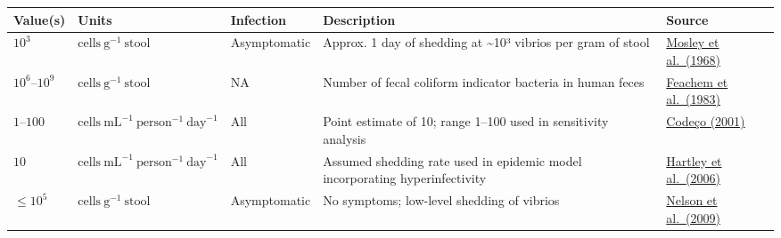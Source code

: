 \documentclass[
]{book}
\begin{document}
\begin{longtable}[]{@{}
  >{\raggedright\arraybackslash}p{}
  >{\raggedright\arraybackslash}p{}
  >{\raggedright\arraybackslash}p{}
  >{\raggedright\arraybackslash}p{}
  >{\raggedright\arraybackslash}p{}@{}}
\toprule\noalign{}
\begin{minipage}[b]{\linewidth}\raggedright
Value(s)
\end{minipage} & \begin{minipage}[b]{\linewidth}\raggedright
Units
\end{minipage} & \begin{minipage}[b]{\linewidth}\raggedright
Infection
\end{minipage} & \begin{minipage}[b]{\linewidth}\raggedright
Description
\end{minipage} & \begin{minipage}[b]{\linewidth}\raggedright
Source
\end{minipage} \\
\midrule\noalign{}
\endhead
\bottomrule\noalign{}
\endlastfoot
\(10^3\) & \(\text{cells}~\text{g}^{-1}~\text{stool}\) & Asymptomatic & Approx. 1 day of shedding at \textasciitilde10³ vibrios per gram of stool & \href{https://www.ncbi.nlm.nih.gov/pmc/articles/PMC2554681/}{Mosley et al.~(1968)} \\
\(10^6\)--\(10^9\) & \(\text{cells}~\text{g}^{-1}~\text{stool}\) & NA & Number of fecal coliform indicator bacteria in human feces & \href{https://documents.worldbank.org/en/publication/documents-reports/documentdetail/en/704041468740420118}{Feachem et al.~(1983)} \\
\(1\)--\(100\) & \(\text{cells}~\text{mL}^{-1}~\text{person}^{-1}~\text{day}^{-1}\) & All & Point estimate of 10; range 1--100 used in sensitivity analysis & \href{https://doi.org/10.1186/1471-2334-1-1}{Codeço (2001)} \\
\(10\) & \(\text{cells}~\text{mL}^{-1}~\text{person}^{-1}~\text{day}^{-1}\) & All & Assumed shedding rate used in epidemic model incorporating hyperinfectivity & \href{https://journals.plos.org/plosmedicine/article?id=10.1371/journal.pmed.0030007}{Hartley et al.~(2006)} \\
\(\leq 10^5\) & \(\text{cells}~\text{g}^{-1}~\text{stool}\) & Asymptomatic & No symptoms; low-level shedding of vibrios & \href{https://www.ncbi.nlm.nih.gov/pmc/articles/PMC3842031/}{Nelson et al.~(2009)} \\

\end{longtable}
\end{document}
